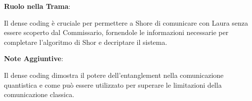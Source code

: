 \begin{tcolorbox}[fontupper=\footnotesize, fontlower=\Large,colback=white,colframe=black,title=\textbf{Dense Coding}]
\begin{multicols}{2}
\textbf{Ruolo nella Trama}:

Il dense coding è cruciale per permettere a Shore di comunicare con Laura senza essere scoperto dal Commissario, fornendole le informazioni necessarie per completare l'algoritmo di Shor e decriptare il sistema.

\textbf{Note Aggiuntive}:

Il dense coding dimostra il potere dell'entanglement nella comunicazione quantistica e come può essere utilizzato per superare le limitazioni della comunicazione classica.

\end{multicols}
\end{tcolorbox}

\vspace{0.5cm}

